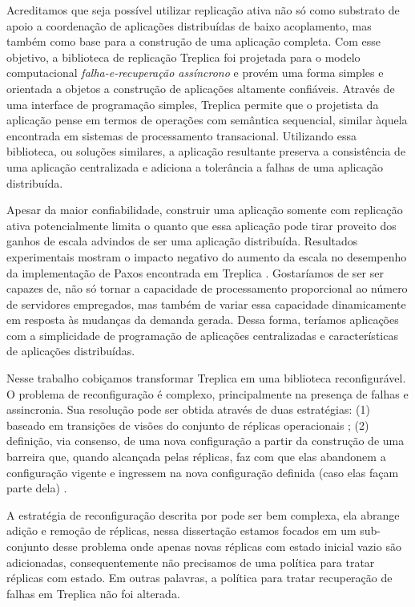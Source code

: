 Acreditamos que seja possível utilizar replicação ativa não só como substrato de apoio a
coordenação de aplicações distribuídas de baixo acoplamento, mas também como base para a
construção de uma aplicação completa. Com esse objetivo, a biblioteca de replicação
Treplica \cite{vieira08a, vieira-tr10b} foi projetada para o modelo computacional
\emph{falha-e-recuperação assíncrono} e provém uma forma simples e orientada a objetos a
construção de aplicações altamente confiáveis. Através de uma interface de programação
simples, Treplica permite que o projetista da aplicação pense em termos de operações com
semântica sequencial, similar àquela encontrada em sistemas de processamento transacional.
Utilizando essa biblioteca, ou soluções similares, a aplicação resultante preserva a
consistência de uma aplicação centralizada e adiciona a tolerância a falhas de uma
aplicação distribuída.

Apesar da maior confiabilidade, construir uma aplicação somente com replicação ativa
potencialmente limita o quanto que essa aplicação pode tirar proveito dos ganhos de escala
advindos de ser uma aplicação distribuída. Resultados experimentais mostram o impacto
negativo do aumento da escala no desempenho da implementação de Paxos encontrada em
Treplica \cite{vieira09}. Gostaríamos de ser ser capazes de, não só tornar a capacidade de
processamento proporcional ao número de servidores empregados, mas também de variar essa
capacidade dinamicamente em resposta às mudanças da demanda gerada. Dessa forma, teríamos
aplicações com a simplicidade de programação de aplicações centralizadas e características
de aplicações distribuídas.

Nesse trabalho cobiçamos transformar Treplica em uma biblioteca reconfigurável. O problema
de reconfiguração é complexo, principalmente na presença de falhas e assincronia. Sua
resolução pode ser obtida através de duas estratégias: (1) baseado em transições de visões
do conjunto de réplicas operacionais \cite{birman87a, birman87b}; (2) definição, via
consenso, de uma nova configuração a partir da construção de uma barreira que, quando
alcançada pelas réplicas, faz com que elas abandonem a configuração vigente e ingressem na
nova configuração definida (caso elas façam parte dela) \cite{lamport10}.

A estratégia de reconfiguração descrita por \cite{lamport10} pode ser bem complexa, ela
abrange adição e remoção de réplicas, nessa dissertação estamos focados em um sub-conjunto
desse problema onde apenas novas réplicas com estado inicial vazio são adicionadas,
consequentemente não precisamos de uma política para tratar réplicas com estado. Em outras
palavras, a política para tratar recuperação de falhas em Treplica não foi alterada.

